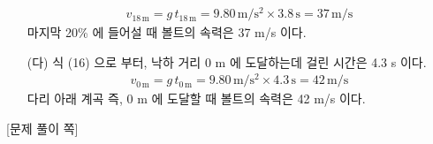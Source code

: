 \documentclass[APS,floatfix,nofootinbib,superscriptaddress,fleqn,preprint]{revtex4}
\begin{document}
\begin{itemize}
  \begin{align}
    v_{18\,\mathrm{m}} = g\,t_{18\,\mathrm{m}} = {9.80\,\mathrm{m/s^2}}\times 3.8\,\mathrm{s} = 37\,\mathrm{m/s}
  \end{align}
  마지막 20\% 에 들어설 때 볼트의 속력은 37 m/s 이다.
  \item[(다)] 식 (16) 으로 부터, 낙하 거리 0 m 에 도달하는데 걸린 시간은 4.3 s 이다.
  \begin{align}
    v_{0\,\mathrm{m}} = g\,t_{0\,\mathrm{m}} = {9.80\,\mathrm{m/s^2}}\times 4.3\,\mathrm{s} = 42\,\mathrm{m/s} 
  \end{align}
  다리 아래 계곡 즉, 0 m 에 도달할 때 볼트의 속력은 42 m/s 이다.
\end{itemize} 
  

\newpage

{\color{gray} [문제 풀이 쪽]}

\newpage
\end{document}
